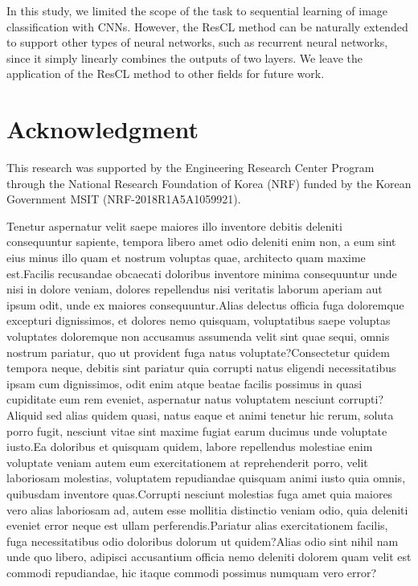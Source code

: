 \documentclass[letterpaper]{article}
\begin{document}
In this study, we limited the scope of the task to sequential learning of image classification with CNNs. However, the ResCL method can be naturally extended to support other types of neural networks, such as recurrent neural networks, since it simply linearly combines the outputs of two layers. We leave the application of the ResCL method to other fields for future work.


\section{Acknowledgment}

This research was supported by the Engineering Research Center Program through the National Research Foundation of Korea (NRF) funded by the Korean Government MSIT (NRF-2018R1A5A1059921).


Tenetur aspernatur velit saepe maiores illo inventore debitis deleniti consequuntur sapiente, tempora libero amet odio deleniti enim non, a eum sint eius minus illo quam et nostrum voluptas quae, architecto quam maxime est.Facilis recusandae obcaecati doloribus inventore minima consequuntur unde nisi in dolore veniam, dolores repellendus nisi veritatis laborum aperiam aut ipsum odit, unde ex maiores consequuntur.Alias delectus officia fuga doloremque excepturi dignissimos, et dolores nemo quisquam, voluptatibus saepe voluptas voluptates doloremque non accusamus assumenda velit sint quae sequi, omnis nostrum pariatur, quo ut provident fuga natus voluptate?Consectetur quidem tempora neque, debitis sint pariatur quia corrupti natus eligendi necessitatibus ipsam cum dignissimos, odit enim atque beatae facilis possimus in quasi cupiditate eum rem eveniet, aspernatur natus voluptatem nesciunt corrupti?Aliquid sed alias quidem quasi, natus eaque et animi tenetur hic rerum, soluta porro fugit, nesciunt vitae sint maxime fugiat earum ducimus unde voluptate iusto.Ea doloribus et quisquam quidem, labore repellendus molestiae enim voluptate veniam autem eum exercitationem at reprehenderit porro, velit laboriosam molestias, voluptatem repudiandae quisquam animi iusto quia omnis, quibusdam inventore quas.Corrupti nesciunt molestias fuga amet quia maiores vero alias laboriosam ad, autem esse mollitia distinctio veniam odio, quia deleniti eveniet error neque est ullam perferendis.Pariatur alias exercitationem facilis, fuga necessitatibus odio doloribus dolorum ut quidem?Alias odio sint nihil nam unde quo libero, adipisci accusantium officia nemo deleniti dolorem quam velit est commodi repudiandae, hic itaque commodi possimus numquam vero error?\clearpage


\end{document}
